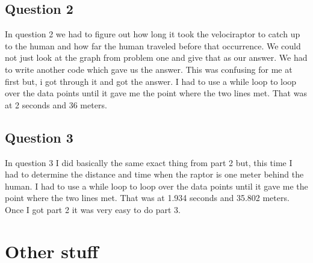 \documentclass[twocolumn]{revtex4}
\begin{document}
\subsection{Question 2}
In question 2 we had to figure out how long it took the velociraptor to catch up to the human and how far the human traveled before that occurrence. We could not just look at the graph from problem one and give that as our answer. We had to write another code which gave us the answer. This was confusing for me at first but, i got through it and got the answer. I had to use a while loop to loop over the data points until it gave me the point where the two lines met. That was at 2 seconds and 36 meters. 

\subsection{Question 3}
In question 3 I did basically the same exact thing from part 2 but, this time I had to determine the distance and time when the raptor is one meter behind the human. I had to use a while loop to loop over the data points until it gave me the point where the two lines met. That was at 1.934 seconds and 35.802 meters. Once I got part 2 it was very easy to do part 3. 


\pagebreak
\section{Other stuff}
\end{document}
